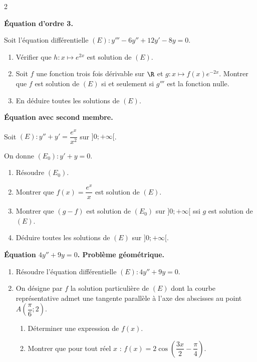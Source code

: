\begin{multicols*}{2}

\begin{Exercice}
\textbf{\'Equation d'ordre 3.}

Soit l'\'equation diff\'erentielle $(E):y'''-6y''+12y'-8y=0$.
\begin{enumerate}
  \item V\'erifier que $h:x\mapsto e^{2x}$ est solution de $(E)$.
  \item Soit $f$ une fonction trois fois d\'erivable sur $\R$ et $g:x\mapsto f(x)e^{-2x}$.
        Montrer que $f$ est solution de $(E)$ si et seulement si $g'''$ est la fonction nulle.
  \item En d\'eduire toutes les solutions de $(E)$.
\end{enumerate}
\end{Exercice}

\begin{Exercice}
\textbf{\'Equation avec second membre.}

Soit $(E):y''+y'=\dfrac{e^x}{x^2}$ sur $]0;+\infty[$.

On donne $(E_0):y'+y=0$.
\begin{enumerate}
  \item R\'esoudre $(E_0)$.
  \item Montrer que $f(x)=\dfrac{e^x}{x}$ est solution de $(E)$.
  \item Montrer que $(g-f)$ est solution de $(E_0)$ sur $]0;+\infty[$ ssi $g$ est solution de $(E)$.
  \item D\'eduire toutes les solutions de $(E)$ sur $]0;+\infty[$.
\end{enumerate}
\end{Exercice}

\begin{Exercice}
\textbf{\'Equation $4y''+9y=0$. Probl\`eme g\'eom\'etrique.}
\begin{enumerate}
  \item R\'esoudre l'\'equation diff\'erentielle $(E):4y''+9y=0$.
  \item On d\'esigne par $f$ la solution particuli\`ere de $(E)$ dont la courbe repr\'esentative
        admet une tangente parall\`ele \`a l'axe des abscisses au point $A\!\left(\dfrac{\pi}{6};2\right)$.
    \begin{enumerate}[label=\alph*)]
      \item D\'eterminer une expression de $f(x)$.
      \item Montrer que pour tout r\'eel $x$ :
            $f(x)=2\cos\!\left(\dfrac{3x}{2}-\dfrac{\pi}{4}\right)$.
    \end{enumerate}
\end{enumerate}
\end{Exercice}

\end{multicols*}
